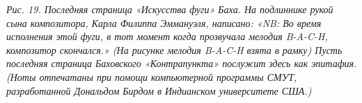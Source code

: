 \documentclass[../main.tex]{subfiles}
\begin{document}
\begin{Dialogue}

\emph{Рис. 19. Последняя страница «Искусства фуги» Баха. На подлиннике рукой сына композитора, Карла Филиппа Эммануэля, написано: «NB: Во время исполнения этой фуги, в тот момент когда прозвучала мелодия \mbox{B-A-C-H}, композитор скончался.» (На рисунке мелодия \mbox{B-A-C-H} взята в рамку) Пусть последняя страница Баховского «Контрапункта» послужит здесь как эпитафия. (Ноты отпечатаны при помощи компьютерной программы СМУТ, разработанной Дональдом Бирдом в Индианском университете США.)}

\end{Dialogue}
\end{document}
